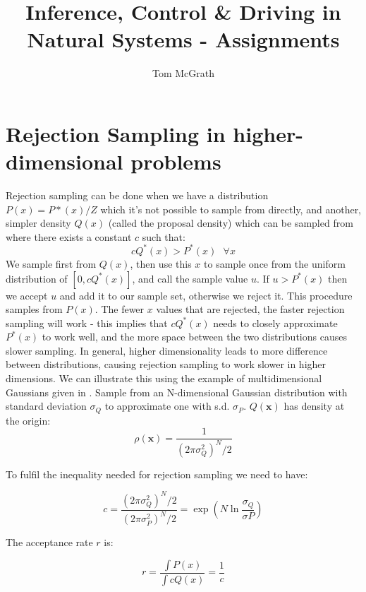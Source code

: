 \documentclass[11pt]{article} %
\title{Inference, Control \& Driving in Natural Systems - Assignments}
\author{Tom McGrath}
\begin{document}
\maketitle
\section{Rejection Sampling in higher-dimensional problems}
Rejection sampling can be done when we have a distribution $P(x) = P*(x)/Z$ which it's not possible to sample from directly, and another, simpler density $Q(x)$ (called the proposal density) which can be sampled from where there exists a constant $c$ such that:
\begin{equation}
cQ^{*}(x) > P^{*}(x) \textit{ $\forall$x}
\end{equation}
We sample first from $Q(x)$, then use this $x$ to sample once from the uniform distribution of $[0, cQ^{*}(x)]$, and call the sample value $u$. If $u > P^{*}(x)$ then we accept $u$ and add it to our sample set, otherwise we reject it. This procedure samples from $P(x)$. The fewer $x$ values that are rejected, the faster rejection sampling will work - this implies that $cQ^{*}(x)$ needs to closely approximate $P^{*}(x)$ to work well, and the more space between the two distributions causes slower sampling. 
\newline
\newline
In general, higher dimensionality leads to more difference between distributions, causing rejection sampling to work slower in higher dimensions. We can illustrate this using the example of multidimensional Gaussians given in \cite{mackay_information_2003}. Sample from an N-dimensional Gaussian distribution with standard deviation $\sigma_{Q}$ to approximate one with s.d. $\sigma_{P}$. $Q(\mathbf{x})$ has density at the origin:
\begin{equation}
\rho(\mathbf{x}) = \frac{1}{(2\pi\sigma^{2}_{Q})^N/2}
\end{equation}

To fulfil the inequality needed for rejection sampling we need to have:

\begin{equation}
c=\frac{(2\pi\sigma^{2}_{Q})^N/2}{(2\pi\sigma^{2}_{P})^N/2}=\exp\left( N \ln\frac{\sigma_{Q}}{\sigma{P}}\right)
\end{equation}

The acceptance rate $r$ is:

\begin{equation}
r = \frac{\int P(x)}{\int c Q(x)} = \frac{1}{c}
\end{equation}
\end{document}
